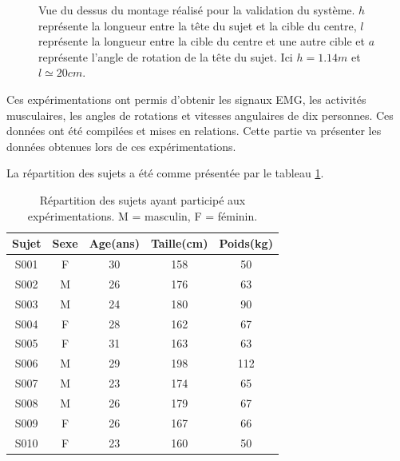 \documentclass[letterpaper, twoside, 12pt, memoire, creativecommons, hyperref]{thETS}
\begin{document}
\begin{figure}
	\centering
	\caption{Vue du dessus du montage réalisé pour la validation du système. $h$ représente la longueur entre la tête du sujet et la cible du centre, $l$ représente la longueur entre la cible du centre et une autre cible et $a$ représente l'angle de rotation de la tête du sujet. Ici $h=1.14m$ et $l\simeq20cm$.}
	\label{fig:sujet}
\end{figure}

Ces expérimentations ont permis d'obtenir les signaux EMG, les activités musculaires, les angles de rotations et vitesses angulaires de dix personnes. Ces données ont été compilées et mises en relations. Cette partie va présenter les données obtenues lors de ces expérimentations.

La répartition des sujets a été comme présentée par le tableau \ref{tab:sujets}.

\begin{table}[ht]
	\caption{Répartition des sujets ayant participé aux expérimentations. M = masculin, F = féminin. }
		\begin{tabular}{|c|c|c|c|c|}
		\hline
			Sujet & Sexe & Age(ans) & Taille(cm) & Poids(kg) \\
	    \hline
	    		S001 & F & 30 & 158 & 50\\
	    \hline
			S002 & M & 26 & 176 & 63\\
	    \hline
	    		S003 & M & 24 & 180 & 90\\
	    \hline
	    		S004 & F & 28 & 162 & 67\\
	    \hline
	    		S005 & F & 31 & 163 & 63\\
	    \hline
	    		S006 & M & 29 & 198 & 112\\
	    \hline
	    		S007 & M & 23 & 174 & 65\\
	    \hline
	    		S008 & M & 26 & 179 & 67\\
	    \hline
	    		S009 & F & 26 & 167 & 66\\
	    \hline
	    		S010 & F & 23 & 160 & 50\\
	    \hline
		\end{tabular}
	\label{tab:sujets}
\end{table}
\end{document}
